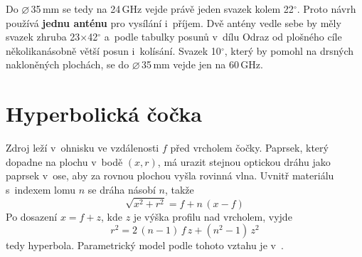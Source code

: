 \documentclass[czech]{skyren}
\begin{document}
Do $\varnothing$\,35\,mm se tedy na 24\,GHz vejde právě jeden svazek kolem
22$^\circ$. Proto návrh používá \textbf{jednu anténu} pro vysílání i~příjem.
Dvě antény vedle sebe by měly svazek zhruba 23$\times$42$^\circ$ a~podle
tabulky posunů v~dílu Odraz od plošného cíle několikanásobně větší posun i~kolísání. Svazek
10$^\circ$, který by pomohl na drsných nakloněných plochách, se do
$\varnothing$\,35\,mm vejde jen na 60\,GHz.

\section{Hyperbolická čočka}

Zdroj leží v~ohnisku ve vzdálenosti $f$ před vrcholem čočky. Paprsek, který
dopadne na plochu v~bodě $(x, r)$, má urazit stejnou optickou dráhu jako
paprsek v~ose, aby za rovnou plochou vyšla rovinná vlna. Uvnitř materiálu
s~indexem lomu $n$ se dráha násobí $n$, takže
\[
\sqrt{x^2 + r^2} = f + n\,(x - f)
\]
Po dosazení $x = f + z$, kde $z$ je výška profilu nad vrcholem, vyjde
\[
r^2 = 2\,(n-1)\,f\,z + (n^2-1)\,z^2
\]
tedy hyperbola. Parametrický model podle tohoto vztahu je
v~.
\end{document}
